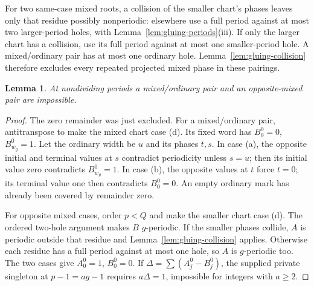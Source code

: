 \documentclass[11pt,a4paper]{amsart}
\numberwithin{equation}{section}
\theoremstyle{plain}
\newtheorem{lemma}[theorem]{Lemma}
\theoremstyle{definition}
\begin{document}
For two same-case mixed roots, a collision of the smaller chart's phases leaves only that residue possibly nonperiodic: elsewhere use a full period against at most two larger-period holes, with Lemma~\ref{lem:gluing-periods}(iii).  If only the larger chart has a collision, use its full period against at most one smaller-period hole.  A mixed/ordinary pair has at most one ordinary hole.  Lemma~\ref{lem:gluing-collision} therefore excludes every repeated projected mixed phase in these pairings.

\begin{lemma}\label{lem:gluing-incompatible}
At nondividing periods a mixed/ordinary pair and an opposite-mixed pair are impossible.
\end{lemma}
\begin{proof}
The zero remainder was just excluded.  For a mixed/ordinary pair, antitranspose to make the mixed chart case (d).  Its fixed word has \(B^0_0=0\), \(B^0_{w_g}=1\).  Let the ordinary width be \(u\) and its phases \(t,s\).  In case (a), the opposite initial and terminal values at \(s\) contradict periodicity unless \(s=u\); then its initial value zero contradicts \(B^0_{w_g}=1\).  In case (b), the opposite values at \(t\) force \(t=0\); its terminal value one then contradicts \(B^0_0=0\).  An empty ordinary mark has already been covered by remainder zero.

For opposite mixed cases, order \(p<Q\) and make the smaller chart case (d).  The ordered two-hole argument makes \(B\) \(g\)-periodic.  If the smaller phases collide, \(A\) is periodic outside that residue and Lemma~\ref{lem:gluing-collision} applies.  Otherwise each residue has a full period against at most one hole, so \(A\) is \(g\)-periodic too.  The two cases give \(A^0_0=1\), \(B^0_0=0\).  If \(\Delta=\sum(A^0_j-B^0_j)\), the supplied private singleton at \(p-1=ag-1\) requires \(a\Delta=1\), impossible for integers with \(a\ge2\).
\end{proof}
\end{document}

